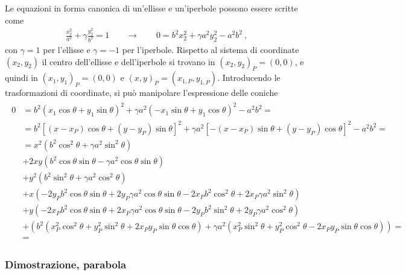 \documentclass[letterpaper,10pt,italian]{jupyterBook}
\begin{document}
\sphinxAtStartPar
Le equazioni in forma canonica di un’ellisse e un’iperbole possono essere scritte come
\begin{equation*}
\begin{split}\frac{x_2^2}{a^2} + \gamma \frac{y_2^2}{b^2} = 1 \qquad \rightarrow \qquad 0 = b^2 x_2^2 + \gamma a^2 y_2^2 - a^2 b^2 \ ,\end{split}
\end{equation*}
\sphinxAtStartPar
con \(\gamma = 1\) per l’ellisse e \(\gamma = -1\) per l’iperbole. Rispetto al sistema di coordinate \((x_2, y_2)\) il centro dell’ellisse e dell’iperbole si trovano in \((x_2, y_2)_P = (0, 0)\), e quindi in \((x_1, y_1)_P = (0,0)\) e \((x, y)_P = (x_{1,P}, y_{1,P})\).
Introducendo le trasformazioni di coordinate, si può manipolare l’espressione delle coniche
\begin{equation*}
\begin{split}\begin{aligned}
  0 
  & = b^2 ( x_1 \cos \theta + y_1 \sin \theta )^2 + \gamma a^2 ( - x_1 \sin \theta + y_1 \cos \theta )^2 - a^2 b^2 = \\
  & = b^2 \left[ ( x - x_P ) \cos \theta + ( y - y_P ) \sin \theta \right]^2 + \gamma a^2 \left[ - ( x - x_P ) \sin \theta + ( y - y_P ) \cos \theta \right]^2 - a^2 b^2 = \\
  & = x^2 \left( b^2 \cos^2 \theta + \gamma a^2 \sin^2 \theta \right) \\
    & + 2 x y \left( b^2 \cos\theta \sin \theta - \gamma a^2 \cos\theta \sin \theta \right) \\
    & + y^2 \left( b^2 \sin^2 \theta + \gamma a^2 \cos^2 \theta \right) \\
    & + x \left(- 2 y_P b^2 \cos \theta \sin \theta  + 2 y_P \gamma a^2 \cos \theta \sin \theta - 2 x_P b^2 \cos^2 \theta + 2 x_P \gamma a^2 \sin^2 \theta  \right) \\
    & + y \left(- 2 x_P b^2 \cos \theta \sin \theta  + 2 x_P \gamma a^2 \cos \theta \sin \theta - 2 y_P b^2 \sin^2 \theta + 2 y_P \gamma a^2 \cos^2 \theta  \right) \\
    & + \left( b^2 ( x_P^2 \cos^2 \theta + y_P^2 \sin^2 \theta + 2 x_P y_P \sin \theta \cos \theta )
      + \gamma a^2 ( x_P^2 \sin^2 \theta + y_P^2 \cos^2 \theta - 2 x_P y_P \sin \theta \cos \theta )  \right) = \\
  & =
\end{aligned}\end{split}
\end{equation*}\subsubsection*{Dimostrazione, parabola}
\end{document}
